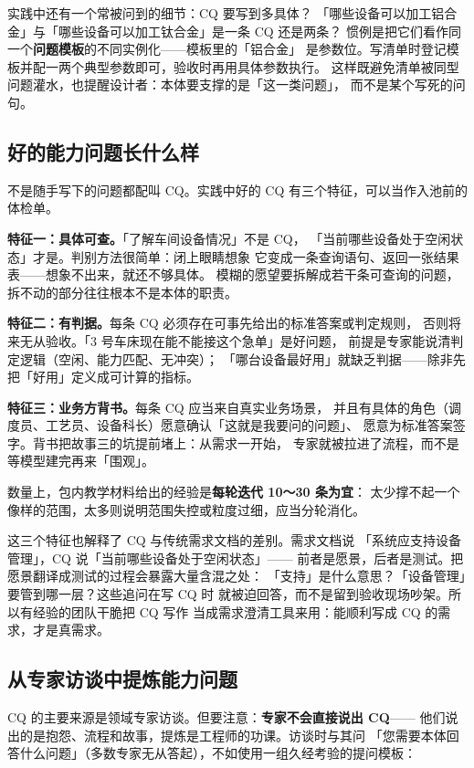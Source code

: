 实践中还有一个常被问到的细节：CQ 要写到多具体？
「哪些设备可以加工铝合金」与「哪些设备可以加工钛合金」是一条 CQ 还是两条？
惯例是把它们看作同一个\textbf{问题模板}的不同实例化——模板里的「铝合金」
是参数位。写清单时登记模板并配一两个典型参数即可，验收时再用具体参数执行。
这样既避免清单被同型问题灌水，也提醒设计者：本体要支撑的是「这一类问题」，
而不是某个写死的问句。

\subsection{好的能力问题长什么样}

不是随手写下的问题都配叫 CQ。实践中好的 CQ 有三个特征，可以当作入池前的体检单。

\textbf{特征一：具体可查。}「了解车间设备情况」不是 CQ，
「当前哪些设备处于空闲状态」才是。判别方法很简单：闭上眼睛想象
它变成一条查询语句、返回一张结果表——想象不出来，就还不够具体。
模糊的愿望要拆解成若干条可查询的问题，拆不动的部分往往根本不是本体的职责。

\textbf{特征二：有判据。}每条 CQ 必须存在可事先给出的标准答案或判定规则，
否则将来无从验收。「3 号车床现在能不能接这个急单」是好问题，
前提是专家能说清判定逻辑（空闲、能力匹配、无冲突）；
「哪台设备最好用」就缺乏判据——除非先把「好用」定义成可计算的指标。

\textbf{特征三：业务方背书。}每条 CQ 应当来自真实业务场景，
并且有具体的角色（调度员、工艺员、设备科长）愿意确认「这就是我要问的问题」、
愿意为标准答案签字。背书把故事三的坑提前堵上：从需求一开始，
专家就被拉进了流程，而不是等模型建完再来「围观」。

数量上，包内教学材料给出的经验是\textbf{每轮迭代 10～30 条为宜}：
太少撑不起一个像样的范围，太多则说明范围失控或粒度过细，应当分轮消化。

这三个特征也解释了 CQ 与传统需求文档的差别。需求文档说
「系统应支持设备管理」，CQ 说「当前哪些设备处于空闲状态」——
前者是愿景，后者是测试。把愿景翻译成测试的过程会暴露大量含混之处：
「支持」是什么意思？「设备管理」要管到哪一层？这些追问在写 CQ 时
就被迫回答，而不是留到验收现场吵架。所以有经验的团队干脆把 CQ 写作
当成需求澄清工具来用：能顺利写成 CQ 的需求，才是真需求。

\subsection{从专家访谈中提炼能力问题}

CQ 的主要来源是领域专家访谈。但要注意：\textbf{专家不会直接说出 CQ}——
他们说出的是抱怨、流程和故事，提炼是工程师的功课。访谈时与其问
「您需要本体回答什么问题」（多数专家无从答起），不如使用一组久经考验的提问模板：

